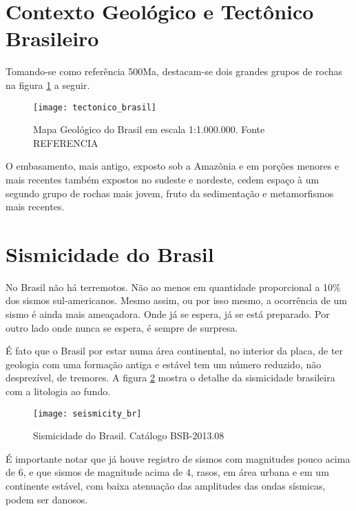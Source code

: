 \section{Contexto Geológico e Tectônico Brasileiro}
\label{sec:geotec_bras}

Tomando-se como referência 500Ma, destacam-se dois grandes grupos de rochas na figura \ref{fig:br_tec} a seguir.

\begin{figure}[H]
  \centering
  \texttt{[image: tectonico\_brasil]} 
  \caption{Mapa Geológico do Brasil em escala 1:1.000.000. Fonte REFERENCIA}
  \label{fig:br_tec} 
\end{figure}

O embasamento, mais antigo, exposto sob a Amazõnia e em porções menores e mais recentes também expostos 
no sudeste e nordeste, cedem espaço à um segundo grupo de rochas mais jovem, fruto da sedimentação e metamorfismos
mais recentes.


\section{Sismicidade do Brasil}
\label{sec:sismicidade_brasil}

No Brasil não há terremotos. Não ao menos em quantidade proporcional a 10\% dos sismos sul-americanos.
Mesmo assim, ou por isso mesmo, a ocorrência de um sismo é ainda mais ameaçadora. Onde já se espera, 
já se está preparado. Por outro lado onde nunca se espera, é sempre de surpresa.

É fato que o Brasil por estar numa área continental, no interior da placa, de ter geologia
com uma formação antiga e estável tem um número reduzido, não desprezível, de tremores. 
A figura \ref{fig:br_seis} mostra o detalhe da sismicidade brasileira com a litologia ao fundo.


\begin{figure}[H]
  \centering
  \texttt{[image: seismicity\_br]} 
  \caption{Sismicidade do Brasil. Catálogo BSB-2013.08}
  \label{fig:br_seis} 
\end{figure}

É importante notar que já houve registro de sismos com magnitudes pouco acima de 6,
e que sismos de magnitude acima de 4, rasos, em área urbana e em um continente estável,
com baixa atenuação das amplitudes das ondas sísmicas, podem ser danosos.


